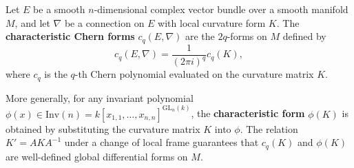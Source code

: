 Let $E$ be a smooth $n$-dimensional complex vector bundle over a smooth manifold $M$, and let $\nabla$ be a connection on $E$ with local curvature form $K$. The \textbf{characteristic Chern forms} $c_q(E, \nabla)$ are the $2q$-forms on $M$ defined by
$$
c_q(E, \nabla) = \frac{1}{(2\pi i)^q} c_q(K),
$$
where $c_q$ is the $q$-th Chern polynomial evaluated on the curvature matrix $K$.

More generally, for any invariant polynomial $\phi(x) \in \text{Inv}(n) = k[x_{1,1}, \ldots, x_{n,n}]^{\text{GL}_n(k)}$, the \textbf{characteristic form} $\phi(K)$ is obtained by substituting the curvature matrix $K$ into $\phi$. The relation $K' = AKA^{-1}$ under a change of local frame guarantees that $c_q(K)$ and $\phi(K)$ are well-defined global differential forms on $M$.
